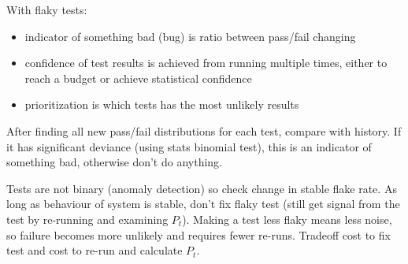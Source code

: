 \documentclass[11pt]{article}
\begin{document}
With flaky tests:
\begin{itemize}
\item indicator of something bad (bug) is ratio between pass/fail changing
\item confidence of test results is achieved from running multiple times, either to reach a budget or
achieve statistical confidence
\item prioritization is which tests has the most unlikely results
\end{itemize}

After finding all new pass/fail distributions for each test, compare with history.
If it has significant deviance (using stats binomial test), this is an indicator of something bad,
otherwise don't do anything.

Tests are not binary (anomaly detection) so check change in stable flake rate.
As long as behaviour of system is stable, don't fix flaky test (still get signal from the test
by re-running and examining \(P_{t}\)).
Making a test less flaky means less noise, so failure becomes more unlikely and requires fewer re-runs.
Tradeoff cost to fix test and cost to re-run and calculate \(P_{t}\).
\end{document}
